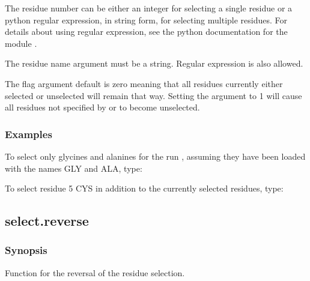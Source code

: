 The residue number can be either an integer for selecting a single residue or a python 
regular expression,  in string form, for selecting multiple residues.  For details about
using regular expression,  see the python  documentation for the module 
.

The residue name argument must be a string.  Regular expression  is also allowed.

The 
 flag argument default is zero meaning that all residues currently either
selected or unselected will remain that way.  Setting the argument to 1 will cause all
residues not specified by 
 or 
 to become unselected.


\subsubsection{Examples}

To select only glycines and alanines for the run 
, assuming they have been loaded with
the names GLY and ALA, type:




To select residue 5 CYS in addition to the currently selected residues, type:








\newpage

\subsection{select.reverse}


\subsubsection{Synopsis}

Function for the reversal of the residue selection.

